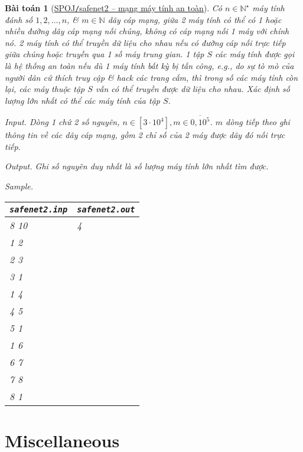 \documentclass{article}
\newtheorem{baitoan}{Bài toán}
\begin{document}
\begin{baitoan}[\href{https://vn.spoj.com/problems/SAFENET2/}{SPOJ{\tt/}safenet2 -- mạng máy tính an toàn}]
    Có $n\in\mathbb{N}^\star$ máy tính đánh số $1,2,\ldots,n$, \& $m\in\mathbb{N}$ dây cáp mạng, giữa 2 máy tính có thể có 1 hoặc nhiều đường dây cáp mạng nối chúng, không có cáp mạng nối 1 máy với chính nó. 2 máy tính có thể truyền dữ liệu cho nhau nếu có đường cáp nối trực tiếp giữa chúng hoặc truyền qua 1 số máy trung gian. 1 tập $S$ các máy tính được gọi là {\rm hệ thống an toàn} nếu dù 1 máy tính bất kỳ bị tấn công, e.g., do sự tò mò của người dân cứ thích truy cập \& hack các trang cấm, thì trong số các máy tính còn lại, các máy thuộc tập $S$ vẫn có thể truyền được dữ liệu cho nhau. Xác định số lượng lớn nhất có thể các máy tính của tập $S$.
    \item {\sf Input.} Dòng 1 chứ 2 số nguyên, $n\in[3\cdot10^4],m\in\overline{0,10^5}$. $m$ dòng tiếp theo ghi thông tin về các dây cáp mạng, gồm 2 chỉ số của 2 máy được dây đó nối trực tiếp.
    \item {\sf Output.} Ghi số nguyên duy nhất là số lượng máy tính lớn nhất tìm được.
    \item {\sf Sample.}
    \begin{table}[H]
        \centering
        \begin{tabular}{|l|l|}
            \hline
            \verb|safenet2.inp| & \verb|safenet2.out| \\
            \hline
            8 10 & 4 \\
            1 2 & \\
            2 3 & \\
            3 1 & \\
            1 4 & \\
            4 5 & \\
            5 1 & \\
            1 6 & \\
            6 7 & \\
            7 8 & \\
            8 1 & \\
            \hline
        \end{tabular}
    \end{table}
\end{baitoan}


\section{Miscellaneous}


\printbibliography[heading=bibintoc]
\end{document}
